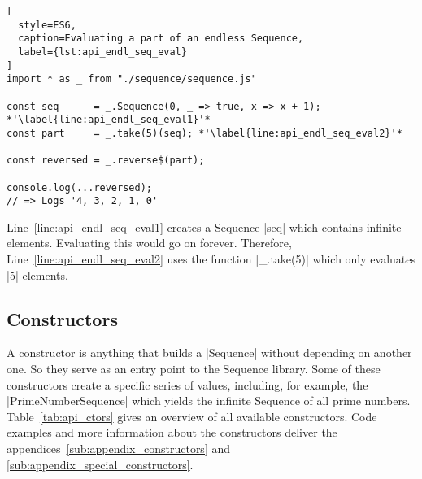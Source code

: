 \begin{lstlisting}[
  style=ES6,
  caption=Evaluating a part of an endless Sequence,
  label={lst:api_endl_seq_eval}
]
import * as _ from "./sequence/sequence.js"

const seq      = _.Sequence(0, _ => true, x => x + 1); *'\label{line:api_endl_seq_eval1}'*
const part     = _.take(5)(seq); *'\label{line:api_endl_seq_eval2}'*

const reversed = _.reverse$(part);

console.log(...reversed);
// => Logs '4, 3, 2, 1, 0'
\end{lstlisting}

Line~\ref{line:api_endl_seq_eval1} creates a Sequence |seq| which contains
infinite elements. Evaluating this would go on forever. Therefore,
Line~\ref{line:api_endl_seq_eval2} uses the function |_.take(5)| which only
evaluates |5| elements.

\subsection{Constructors} %
\label{sub:api_Constructors}
A constructor is anything that builds a |Sequence| without depending on another
one. So they serve as an entry point to the Sequence library. Some of these
constructors create a specific series of values, including, for example, the
|PrimeNumberSequence| which yields the infinite Sequence of all prime
numbers.\\
Table~\ref{tab:api_ctors} gives an overview of all available constructors. Code
examples and more information about the constructors deliver the
appendices~\ref{sub:appendix_constructors} and
\ref{sub:appendix_special_constructors}.

